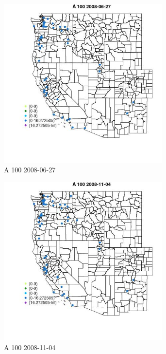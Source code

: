 \begin{figure} 
\centering  
\includegraphics[width=0.77\textwidth]{Code_Outputs/Report_ML_input_PM25_Step4_part_e_de_duplicated_aves_MapObsA_1002008-06-27.jpg} 
\caption{\label{fig:Report_ML_input_PM25_Step4_part_e_de_duplicated_avesMapObsA_1002008-06-27}A 100 2008-06-27} 
\end{figure} 
 

\clearpage 

\begin{figure} 
\centering  
\includegraphics[width=0.77\textwidth]{Code_Outputs/Report_ML_input_PM25_Step4_part_e_de_duplicated_aves_MapObsA_1002008-11-04.jpg} 
\caption{\label{fig:Report_ML_input_PM25_Step4_part_e_de_duplicated_avesMapObsA_1002008-11-04}A 100 2008-11-04} 
\end{figure} 
 

